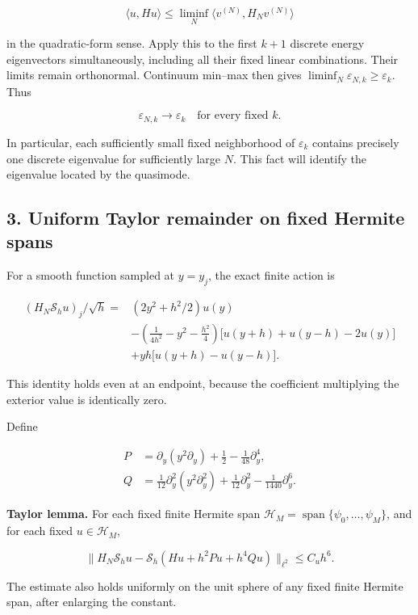 \documentclass[
  10pt,
  a4paper,
]{article}
\begin{document}
\[
\langle u,Hu\rangle\le\liminf_N\langle v^{(N)},H_Nv^{(N)}\rangle
\]

in the quadratic-form sense. Apply this to the first \(k+1\) discrete energy eigenvectors simultaneously, including all their fixed linear combinations. Their limits remain orthonormal. Continuum min--max then gives \(\liminf_N\varepsilon_{N,k}\ge\varepsilon_k\). Thus

\[
\boxed{\varepsilon_{N,k}\to\varepsilon_k\quad\text{for every fixed }k.}\tag{4}
\]

In particular, each sufficiently small fixed neighborhood of \(\varepsilon_k\) contains precisely one discrete eigenvalue for sufficiently large \(N\). This fact will identify the eigenvalue located by the quasimode.

\subsection{3. Uniform Taylor remainder on fixed Hermite spans}\label{uniform-taylor-remainder-on-fixed-hermite-spans}

For a smooth function sampled at \(y=y_j\), the exact finite action is

\[
\begin{aligned}
(H_N\mathcal S_hu)_j/\sqrt h={}&(2y^2+h^2/2)u(y)\\
&-\left(\frac1{4h^2}-y^2-\frac{h^2}4\right)
 \bigl[u(y+h)+u(y-h)-2u(y)\bigr]\\
&+yh\bigl[u(y+h)-u(y-h)\bigr].
\end{aligned}\tag{5}
\]

This identity holds even at an endpoint, because the coefficient multiplying the exterior value is identically zero.

Define

\[
\begin{aligned}
P&=\partial_y(y^2\partial_y)+\tfrac12-\tfrac1{48}\partial_y^4,\\
Q&=\tfrac1{12}\partial_y^2(y^2\partial_y^2)
+\tfrac1{12}\partial_y^2-\tfrac1{1440}\partial_y^6.
\end{aligned}\tag{6}
\]

\textbf{Taylor lemma.} For each fixed finite Hermite span \(\mathcal H_M=\operatorname{span}\{\psi_0,\ldots,\psi_M\}\), and for each fixed \(u\in\mathcal H_M\),

\[
\|H_N\mathcal S_hu-\mathcal S_h(Hu+h^2Pu+h^4Qu)\|_{\ell^2}
\le C_u h^6.\tag{7}
\]

The estimate also holds uniformly on the unit sphere of any fixed finite Hermite span, after enlarging the constant.
\end{document}

